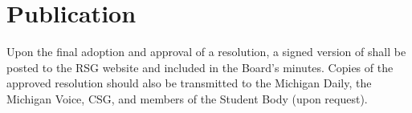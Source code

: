 \section{Publication}
\begin{enumsubsection}
\itemnotoc Upon the final adoption and approval of a resolution, a signed version of 
shall be posted to the RSG website and included in the Board's minutes. 
\itemnotoc Copies of the approved resolution should also be transmitted to the 
Michigan Daily, the Michigan Voice, CSG, and members of the Student 
Body (upon request). 
\end{enumsubsection}
